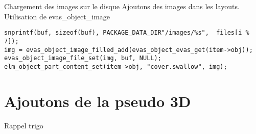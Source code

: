 \documentclass{beamer}
\newcounter{image}
\begin{document}
\begin{frame}[fragile]{Chargement des images sur le disque}
Ajoutons des images dans les layouts. \\
Utilisation de evas\_object\_image
\begin{lstlisting}
snprintf(buf, sizeof(buf), PACKAGE_DATA_DIR"/images/%s",  files[i % 7]);
img = evas_object_image_filled_add(evas_object_evas_get(item->obj));
evas_object_image_file_set(img, buf, NULL);
elm_object_part_content_set(item->obj, "cover.swallow", img);
\end{lstlisting}
\end{frame}

\section{Ajoutons de la pseudo 3D}
\begin{frame}[fragile]{Rappel trigo}

\end{frame}
\end{document}
